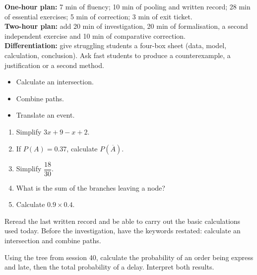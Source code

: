     \ifprof
    \begin{methode}
    \textbf{One-hour plan:} 7 min of fluency; 10 min of pooling and written record; 28 min of essential exercises; 5 min of correction; 3 min of exit ticket.\\
    \textbf{Two-hour plan:} add 20 min of investigation, 20 min of formalisation, a second independent exercise and 10 min of comparative correction.\\
    \textbf{Differentiation:} give struggling students a four-box sheet (data, model, calculation, conclusion). Ask fast students to produce a counterexample, a justification or a second method.
    \end{methode}
    \fi
{}
    \begin{objectifs}\begin{itemize}\item Calculate an intersection.\item Combine paths.\item Translate an event.\end{itemize}\end{objectifs}
    \begin{automatismes}\begin{enumerate}\item Simplify $3x+9-x+2$. \item If $P(A)=0.37$, calculate $P(\overline A)$. \item Simplify $\dfrac{18}{30}$. \item What is the sum of the branches leaving a node? \item Calculate $0.9\times0.4$. \end{enumerate}\end{automatismes}
    \begin{prerequis}Reread the last written record and be able to carry out the basic calculations used today. Before the investigation, have the keywords restated: calculate an intersection and combine paths.\end{prerequis}

    \begin{activite}
    Using the tree from session 40, calculate the probability of an order being express and late, then the total probability of a delay. Interpret both results.
    \begin{center}\end{center}
    \end{activite}

